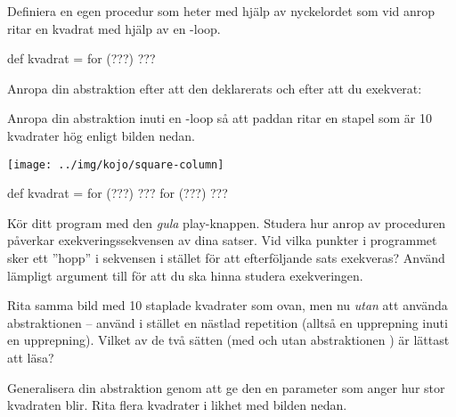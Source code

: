 
\Subtask Definiera en egen procedur som heter  med hjälp av nyckelordet  som vid anrop ritar en kvadrat med hjälp av en -loop.

\begin{Code}
def kvadrat = for (???) {???}
\end{Code}


\Subtask Anropa din abstraktion efter att den deklarerats och efter att du exekverat:\\


\Subtask Anropa din abstraktion inuti en -loop så att paddan ritar en stapel som är 10 kvadrater hög enligt bilden nedan.


\begin{multicols}{2}

\texttt{[image: ../img/kojo/square-column]}

\columnbreak

\begin{Code}
def kvadrat = for (???) {???}
for (???) {???}
\end{Code}

\end{multicols}

\Subtask Kör ditt program med den \emph{gula} play-knappen. Studera hur anrop av proceduren  påverkar exekveringssekvensen av dina satser. Vid vilka punkter i programmet sker ett ''hopp'' i sekvensen i stället för att efterföljande sats exekveras? Använd lämpligt argument till  för att du ska hinna studera exekveringen.


\Subtask Rita samma bild med 10 staplade kvadrater som ovan, men nu \emph{utan} att använda abstraktionen  -- använd i stället en nästlad repetition (alltså en upprepning inuti en upprepning). Vilket av de två sätten (med och utan abstraktionen ) är lättast att läsa? %

\Subtask Generalisera din abstraktion  genom att ge den en parameter  som anger hur stor kvadraten blir. Rita flera kvadrater i likhet med bilden nedan.

